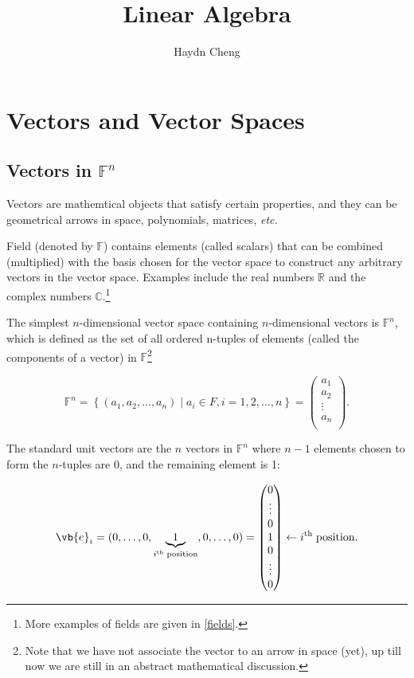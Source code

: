 \documentclass[a4paper,12pt]{report}
\title{Linear Algebra}
\author{Haydn Cheng}
\date{}
\begin{document}
\maketitle
\tableofcontents


\chapter{Vectors and Vector Spaces}

\section{Vectors in \(\mathbb{F}^{n} \)}

Vectors are mathemtical objects that satisfy certain properties, and they can be geometrical arrows in space, polynomials, matrices, \textit{etc.} 

Field (denoted by \(\mathbb{F}\)) contains elements (called scalars) that can be combined (multiplied) with the basis chosen for the vector space to construct any arbitrary vectors in the vector space. Examples include the real numbers \(\mathbb{R}\) and the complex numbers \(\mathbb{C}\).\footnote{More examples of fields are given in \cref{fields}.} 

The simplest \(n\)-dimensional vector space containing \(n\)-dimensional vectors is \(\mathbb{F}^{n} \), which is defined as the set of all ordered n-tuples of elements (called the components of a vector) in \(\mathbb{F}\)\footnote{Note that we have not associate the vector to an arrow in space (yet), up till now we are still in an abstract mathematical discussion.} 

\begin{equation}
    \mathbb{F}^{n} = \left\{ (a_1 , a_2 ,\ldots ,a_{n} ) \mid a_{i} \in F, i = 1,2,\ldots ,n  \right\} = \begin{pmatrix}
         a_1   \\
         a_2  \\
         \vdots  \\
         a_{n}  \\
    \end{pmatrix}.
\end{equation}

The standard unit vectors are the \(n\) vectors in \(\mathbb{F}^{n} \) where \(n-1\) elements chosen to form the \(n\)-tuples are 0, and the remaining element is 1:  

\begin{equation}
    \vb{e} _{i} = (0,\ldots ,0,\underbrace{1}_{i^{\text{th }} \text{position} }, 0, \ldots , 0) = \begin{pmatrix}
         0 \\
         \vdots  \\
         0 \\
         1 \\
         0 \\
         \vdots  \\
         0 \\
    \end{pmatrix} \leftarrow i^{\text{th }}   \text{position}  .
\end{equation}
\end{document}
